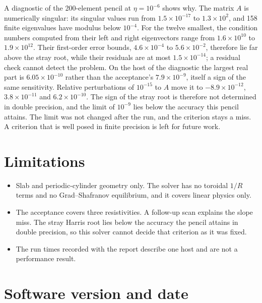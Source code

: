 \documentclass[11pt]{article}
\begin{document}
A diagnostic of the 200-element pencil at $\eta = 10^{-6}$ shows why.  The
matrix $A$ is numerically singular: its singular values run from $1.5 \times
10^{-17}$ to $1.3 \times 10^{2}$, and 158 finite eigenvalues have modulus
below $10^{-4}$.  For the twelve smallest, the condition numbers computed from
their left and right eigenvectors range from $1.6 \times 10^{10}$ to $1.9
\times 10^{12}$.  Their first-order error bounds, $4.6 \times 10^{-4}$ to
$5.6 \times 10^{-2}$, therefore lie far above the stray root, while their
residuals are at most $1.5 \times 10^{-14}$; a residual check cannot detect
the problem.  On the host of the diagnostic the largest real part is $6.05
\times 10^{-10}$ rather than the acceptance's $7.9 \times 10^{-9}$, itself a
sign of the same sensitivity.  Relative perturbations of $10^{-15}$ to $A$
move it to $-8.9 \times 10^{-12}$, $3.8 \times 10^{-11}$ and $6.2 \times
10^{-10}$.  The sign of the stray root is therefore not determined in double
precision, and the limit of $10^{-9}$ lies below the accuracy this pencil
attains.  The limit was not changed after the run, and the criterion stays a
miss.  A criterion that is well posed in finite precision is left for future
work.

\section{Limitations}

\begin{itemize}
\item Slab and periodic-cylinder geometry only.  The solver has no toroidal
$1/R$ terms and no Grad--Shafranov equilibrium, and it covers linear physics
only.
\item The acceptance covers three resistivities.  A follow-up scan explains
the slope miss.  The stray Harris root lies below the accuracy the pencil
attains in double precision, so this solver cannot decide that criterion as it
was fixed.
\item The run times recorded with the report describe one host and are not a
performance result.
\end{itemize}

\section*{Software version and date}
\end{document}
